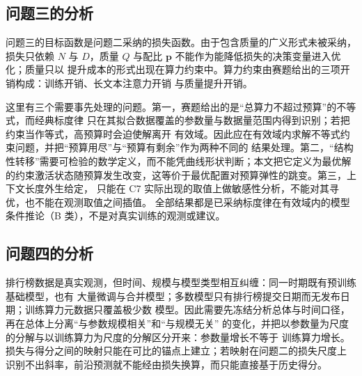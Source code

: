 \subsection{问题三的分析}

问题三的目标函数是问题二采纳的损失函数。由于包含质量的广义形式未被采纳，损失只依赖
$N$ 与 $D$，质量 $Q$ 与配比 $\boldsymbol{p}$ 不能作为能降低损失的决策变量进入优化；质量只以
提升成本的形式出现在算力约束中。算力约束由赛题给出的三项开销构成：训练开销、长文本注意力开销
与质量提升开销。

这里有三个需要事先处理的问题。第一，赛题给出的是“总算力不超过预算”的不等式，而经典标度律
只在其拟合数据覆盖的参数量与数据量范围内得到识别；若把约束当作等式，高预算时会迫使解离开
有效域。因此应在有效域内求解不等式约束问题，并把“预算用尽”与“预算有剩余”作为两种不同的
结果处理。第二，“结构性转移”需要可检验的数学定义，而不能凭曲线形状判断；本文把它定义为最优解
的约束激活状态随预算发生改变，这等价于最优配置对预算弹性的跳变。第三，上下文长度外生给定，
只能在 C7 实际出现的取值上做敏感性分析，不能对其寻优，也不能在观测取值之间插值。
全部结果都是已采纳标度律在有效域内的模型条件推论（B 类），不是对真实训练的观测或建议。

\subsection{问题四的分析}

排行榜数据是真实观测，但时间、规模与模型类型相互纠缠：同一时期既有预训练基础模型，也有
大量微调与合并模型；多数模型只有排行榜提交日期而无发布日期；训练算力元数据只覆盖极少数
模型。因此需要先冻结分析总体与时间口径，再在总体上分离“与参数规模相关”和“与规模无关”
的变化，并把以参数量为尺度的分解与以训练算力为尺度的分解区分开来：参数量增长不等于
训练算力增长。损失与得分之间的映射只能在可比的锚点上建立；若映射在问题二的损失尺度上
识别不出斜率，前沿预测就不能经由损失换算，而只能直接基于历史得分。
